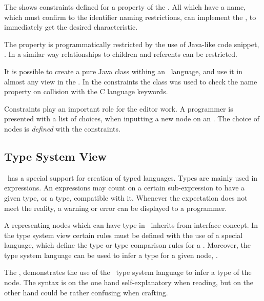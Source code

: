 
The  shows constraints defined for a property  of the  .
All  which have a name, which must confirm to the identifier naming restrictions, can implement the ,
to immediately get the desired characteristic.

The  property is programmatically restricted by the use of Java-like code snippet, . In a similar way
relationships to children and referents can be restricted.

It is possible to create a pure Java class withing an \jbmps\ language, and use it in almost any  view in the \jbmps. 
In the   constraints the  class was used to check the
name property on collision with the C language keywords.

Constraints play an important role for the editor work. A programmer is presented with a list of choices, when inputting
a new node on an . The choice of nodes is \emph{defined} with the constraints.

\subsection{Type System View}
\label{mpsts}
\jbmps\ has a special support for creation of typed languages. Types are mainly used in expressions. An expressions may count on 
a certain sub-expression to have a given type, or a type, compatible with it. Whenever the expectation does not meet the reality,
a warning or error can be displayed to a programmer. 


A  representing nodes which can have type in \mbdr\ inherits from  interface concept. In the type system view
certain rules must be defined with the use of a special language, which define the type or type comparison rules for a .
Moreover, the type system language can be used to infer a type for a given node, .

The , demonstrates the use of the \jbmps\ type system language to infer a type of the  
node. The syntax is on the one hand self-explanatory when reading, but on the other hand could be rather confusing when crafting.

